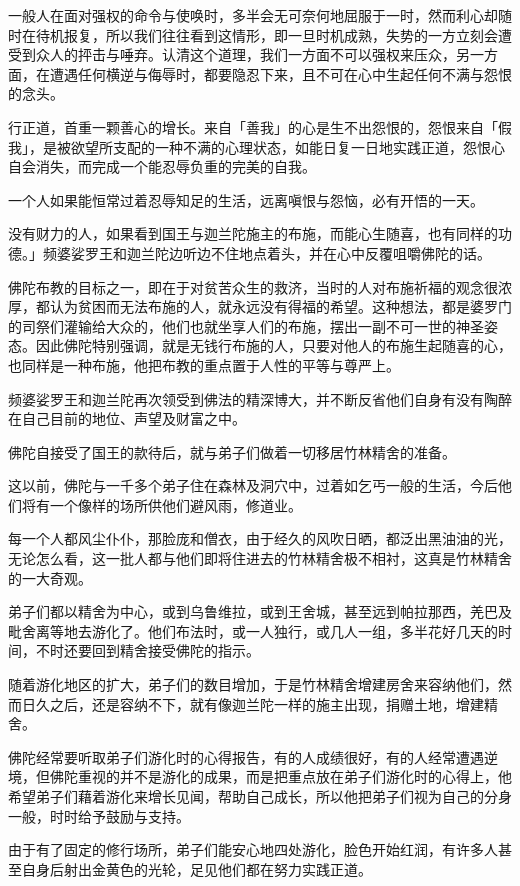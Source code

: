 \documentclass[12pt,twoside,openany]{book}
\begin{document}
一般人在面对强权的命令与使唤时，多半会无可奈何地屈服于一时，然而利心却随时在待机报复，所以我们往往看到这情形，即一旦时机成熟，失势的一方立刻会遭受到众人的抨击与唾弃。认清这个道理，我们一方面不可以强权来压众，另一方面，在遭遇任何横逆与侮辱时，都要隐忍下来，且不可在心中生起任何不满与怨恨的念头。

行正道，首重一颗善心的增长。来自「善我」的心是生不出怨恨的，怨恨来自「假我」，是被欲望所支配的一种不满的心理状态，如能日复一日地实践正道，怨恨心自会消失，而完成一个能忍辱负重的完美的自我。

一个人如果能恒常过着忍辱知足的生活，远离嗔恨与怨恼，必有开悟的一天。

没有财力的人，如果看到国王与迦兰陀施主的布施，而能心生随喜，也有同样的功德。」频婆娑罗王和迦兰陀边听边不住地点着头，并在心中反覆咀嚼佛陀的话。

佛陀布教的目标之一，即在于对贫苦众生的救济，当时的人对布施祈福的观念很浓厚，都认为贫困而无法布施的人，就永远没有得福的希望。这种想法，都是婆罗门的司祭们灌输给大众的，他们也就坐享人们的布施，摆出一副不可一世的神圣姿态。因此佛陀特别强调，就是无钱行布施的人，只要对他人的布施生起随喜的心，也同样是一种布施，他把布教的重点置于人性的平等与尊严上。

频婆娑罗王和迦兰陀再次领受到佛法的精深博大，并不断反省他们自身有没有陶醉在自己目前的地位、声望及财富之中。

佛陀自接受了国王的款待后，就与弟子们做着一切移居竹林精舍的准备。

这以前，佛陀与一千多个弟子住在森林及洞穴中，过着如乞丐一般的生活，今后他们将有一个像样的场所供他们避风雨，修道业。

每一个人都风尘仆仆，那脸庞和僧衣，由于经久的风吹日晒，都泛出黑油油的光，无论怎么看，这一批人都与他们即将住进去的竹林精舍极不相衬，这真是竹林精舍的一大奇观。

弟子们都以精舍为中心，或到乌鲁维拉，或到王舍城，甚至远到帕拉那西，羌巴及毗舍离等地去游化了。他们布法时，或一人独行，或几人一组，多半花好几天的时间，不时还要回到精舍接受佛陀的指示。

随着游化地区的扩大，弟子们的数目增加，于是竹林精舍增建房舍来容纳他们，然而日久之后，还是容纳不下，就有像迦兰陀一样的施主出现，捐赠土地，增建精舍。

佛陀经常要听取弟子们游化时的心得报告，有的人成绩很好，有的人经常遭遇逆境，但佛陀重视的并不是游化的成果，而是把重点放在弟子们游化时的心得上，他希望弟子们藉着游化来增长见闻，帮助自己成长，所以他把弟子们视为自己的分身一般，时时给予鼓励与支持。

由于有了固定的修行场所，弟子们能安心地四处游化，脸色开始红润，有许多人甚至自身后射出金黄色的光轮，足见他们都在努力实践正道。
\end{document}
